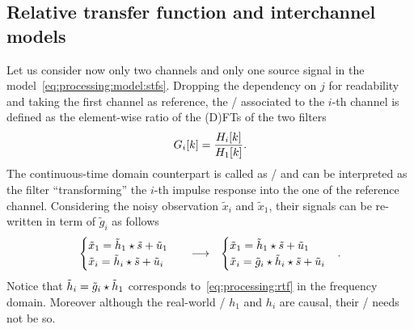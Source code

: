 \subsection{Relative transfer function and interchannel models}\label{subsec:processing:rtf}
Let us consider now only two channels and only one source signal in the model~\cref{eq:processing:model:stfs}.
Dropping the dependency on $j$ for readability and taking the first channel as reference, the \ReTFdef/ associated to the $i$-th channel is defined as
the element-wise ratio of the (D)FTs of the two filters~
\begin{equation}\label{eq:processing:rtf}
    {G}_i[k] = \frac{{H}_i[k]}{{H}_1[k]}
    .
\end{equation}
The continuous-time domain counterpart is called as \ReIRdef/ and can be interpreted as the filter ``transforming'' the $i$-th impulse response into the one of the reference channel.
Considering the noisy observation $\tilde{x}_i$ and $\tilde{x}_1$, their signals can be re-written in term of $\tilde{g}_i$ as follows
\begin{equation}
    \begin{matrix}
    \begin{cases}
        \tilde{x}_1 = \tilde{h}_1 \star \tilde{s} + \tilde{u}_1 \\
        \tilde{x}_i = \tilde{h}_i \star \tilde{s} + \tilde{u}_i
    \end{cases} & \longrightarrow  & \begin{cases}
        \tilde{x}_1 = \tilde{h}_1 \star \tilde{s} + \tilde{u}_1 \\
        \tilde{x}_i = \tilde{g}_i \star \tilde{h}_i \star \tilde{s} + \tilde{u}_i
    \end{cases}
    \end{matrix}
    .
\end{equation}
Notice that $\tilde{h}_i = \tilde{g}_i \star \tilde{h}_1$ corresponds to~\cref{eq:processing:rtf} in the frequency domain.
Moreover although the real-world \RIRs/ $h_1$ and $h_i$ are causal, their \ReTF/ needs not be so.


